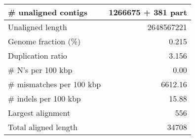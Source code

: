 \documentclass[12pt,a4paper]{article}
\begin{document}
\begin{table}[ht]
\begin{center}
\begin{tabular}{|l*{1}{|r}|}
\# unaligned contigs & 1266675 + 381 part \\ \hline
Unaligned length & 2648567221 \\ \hline
Genome fraction (\%) & 0.215 \\ \hline
Duplication ratio & 3.156 \\ \hline
\# N's per 100 kbp & 0.00 \\ \hline
\# mismatches per 100 kbp & 6612.16 \\ \hline
\# indels per 100 kbp & 15.88 \\ \hline
Largest alignment & 556 \\ \hline
Total aligned length & 34708 \\ \hline
\end{tabular}
\end{center}
\end{table}
\end{document}
